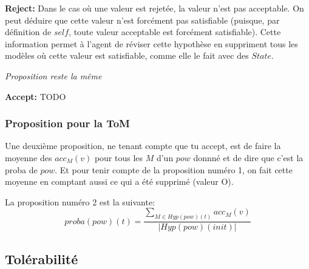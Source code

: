 \documentclass{llncs}
\begin{document}
		\textbf{Reject:} Dans le cas où une valeur est rejetée, la valeur n'est pas acceptable. On peut déduire que cette valeur n'est forcément pas satisfiable (puisque, par définition de $self$, toute valeur acceptable est forcément satisfiable). Cette information permet à l'agent de réviser cette hypothèse en suppriment tous les modèles où cette valeur est satisfiable, comme elle le fait avec des $State$.
		
		\emph{Proposition reste la même}
		
		\textbf{Accept:} TODO
%	

	\subsubsection{Proposition pour la ToM}
	Une deuxième proposition, ne tenant compte que tu accept, est de faire la moyenne des $acc_{M}(v)$ pour tous les $M$ d'un $pow$ donnné et de dire que c'est la proba de $pow$. Et pour tenir compte de la proposition numéro 1, on fait cette moyenne en comptant aussi ce qui a été supprimé (valeur O).
	
	La proposition numéro 2 est la suivante:
	$$proba(pow)(t) = \frac{\sum_{M\in Hyp(pow)(t)} acc_M(v)}{|Hyp(pow)(init)|}$$


	\subsection{Tolérabilité}
	
	
	
\end{document}
